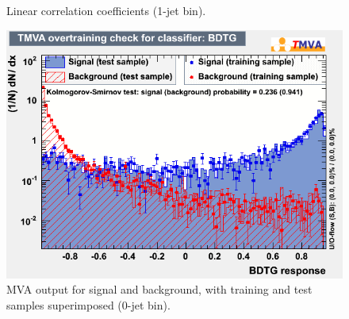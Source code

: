 \begin{figure}[!hbtp]
\begin{center}
\caption{Linear correlation coefficients (1-jet bin).}
\label{fig:lincorr1j}
\end{center}
\end{figure}

\begin{figure}[!hbtp]
\begin{center}
\includegraphics[width=.6\textwidth]{figures/mvaout_jae_0j_log.png}
\caption{MVA output for signal and background, with training and test samples superimposed (0-jet bin).}
\label{fig:mvaout_jae_0j_log}
\end{center}
\end{figure}

